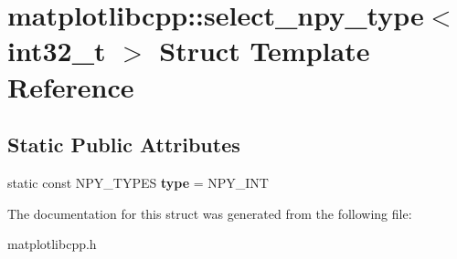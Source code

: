 \hypertarget{structmatplotlibcpp_1_1select__npy__type_3_01int32__t_01_4}{}\section{matplotlibcpp\+:\+:select\+\_\+npy\+\_\+type$<$ int32\+\_\+t $>$ Struct Template Reference}
\label{structmatplotlibcpp_1_1select__npy__type_3_01int32__t_01_4}
\subsection*{Static Public Attributes}
\begin{DoxyCompactItemize}
\item 
\mbox{\label{structmatplotlibcpp_1_1select__npy__type_3_01int32__t_01_4_abcfd0c3dc5d5e92575c04747315cb4d5}} 
static const N\+P\+Y\+\_\+\+T\+Y\+P\+ES {\bfseries type} = N\+P\+Y\+\_\+\+I\+NT
\end{DoxyCompactItemize}


The documentation for this struct was generated from the following file\+:\begin{DoxyCompactItemize}
\item 
matplotlibcpp.\+h\end{DoxyCompactItemize}

